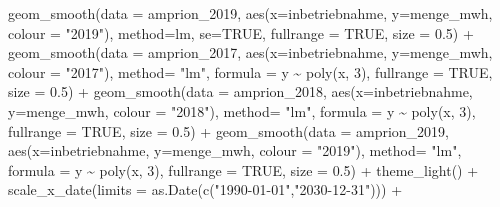 \documentclass[a4paper,11pt]{article}
\newenvironment{Shaded}{\begin{snugshade}}{\end{snugshade}}
\newcommand{\AttributeTok}[1]{\textcolor[rgb]{0.77,0.63,0.00}{#1}}
\newcommand{\ConstantTok}[1]{\textcolor[rgb]{0.00,0.00,0.00}{#1}}
\newcommand{\DecValTok}[1]{\textcolor[rgb]{0.00,0.00,0.81}{#1}}
\newcommand{\FloatTok}[1]{\textcolor[rgb]{0.00,0.00,0.81}{#1}}
\newcommand{\FunctionTok}[1]{\textcolor[rgb]{0.00,0.00,0.00}{#1}}
\newcommand{\NormalTok}[1]{#1}
\newcommand{\SpecialCharTok}[1]{\textcolor[rgb]{0.00,0.00,0.00}{#1}}
\newcommand{\StringTok}[1]{\textcolor[rgb]{0.31,0.60,0.02}{#1}}
\begin{document}
\begin{Shaded}
\begin{Highlighting}[]
  \FunctionTok{geom\_smooth}\NormalTok{(}\AttributeTok{data =}\NormalTok{ amprion\_2019, }
              \FunctionTok{aes}\NormalTok{(}\AttributeTok{x=}\NormalTok{inbetriebnahme, }\AttributeTok{y=}\NormalTok{menge\_mwh, }\AttributeTok{colour =} \StringTok{"2019"}\NormalTok{), }
              \AttributeTok{method=}\NormalTok{lm, }\AttributeTok{se=}\ConstantTok{TRUE}\NormalTok{, }\AttributeTok{fullrange =} \ConstantTok{TRUE}\NormalTok{, }\AttributeTok{size =} \FloatTok{0.5}\NormalTok{)  }\SpecialCharTok{+}
  \FunctionTok{geom\_smooth}\NormalTok{(}\AttributeTok{data =}\NormalTok{ amprion\_2017, }
              \FunctionTok{aes}\NormalTok{(}\AttributeTok{x=}\NormalTok{inbetriebnahme, }\AttributeTok{y=}\NormalTok{menge\_mwh, }\AttributeTok{colour =} \StringTok{"2017"}\NormalTok{), }
              \AttributeTok{method=} \StringTok{"lm"}\NormalTok{, }\AttributeTok{formula =}\NormalTok{ y }\SpecialCharTok{\textasciitilde{}} \FunctionTok{poly}\NormalTok{(x, }\DecValTok{3}\NormalTok{), }
              \AttributeTok{fullrange =} \ConstantTok{TRUE}\NormalTok{, }\AttributeTok{size =} \FloatTok{0.5}\NormalTok{)  }\SpecialCharTok{+}
  \FunctionTok{geom\_smooth}\NormalTok{(}\AttributeTok{data =}\NormalTok{ amprion\_2018, }
              \FunctionTok{aes}\NormalTok{(}\AttributeTok{x=}\NormalTok{inbetriebnahme, }\AttributeTok{y=}\NormalTok{menge\_mwh, }\AttributeTok{colour =} \StringTok{"2018"}\NormalTok{), }
              \AttributeTok{method=} \StringTok{"lm"}\NormalTok{, }\AttributeTok{formula =}\NormalTok{ y }\SpecialCharTok{\textasciitilde{}} \FunctionTok{poly}\NormalTok{(x, }\DecValTok{3}\NormalTok{), }
              \AttributeTok{fullrange =} \ConstantTok{TRUE}\NormalTok{, }\AttributeTok{size =} \FloatTok{0.5}\NormalTok{)  }\SpecialCharTok{+}
  \FunctionTok{geom\_smooth}\NormalTok{(}\AttributeTok{data =}\NormalTok{ amprion\_2019, }
              \FunctionTok{aes}\NormalTok{(}\AttributeTok{x=}\NormalTok{inbetriebnahme, }\AttributeTok{y=}\NormalTok{menge\_mwh, }\AttributeTok{colour =} \StringTok{"2019"}\NormalTok{), }
              \AttributeTok{method=} \StringTok{"lm"}\NormalTok{, }\AttributeTok{formula =}\NormalTok{ y }\SpecialCharTok{\textasciitilde{}} \FunctionTok{poly}\NormalTok{(x, }\DecValTok{3}\NormalTok{), }
              \AttributeTok{fullrange =} \ConstantTok{TRUE}\NormalTok{, }\AttributeTok{size =} \FloatTok{0.5}\NormalTok{)  }\SpecialCharTok{+}
  \FunctionTok{theme\_light}\NormalTok{() }\SpecialCharTok{+}
  \FunctionTok{scale\_x\_date}\NormalTok{(}\AttributeTok{limits =} \FunctionTok{as.Date}\NormalTok{(}\FunctionTok{c}\NormalTok{(}\StringTok{"1990{-}01{-}01"}\NormalTok{,}\StringTok{"2030{-}12{-}31"}\NormalTok{))) }\SpecialCharTok{+}

\end{Highlighting}
\end{Shaded}
\end{document}
